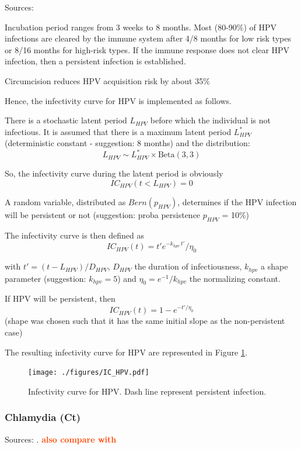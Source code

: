 \documentclass[11pt, onecolumn]{article}
\newcommand{\warning}[1]{\textbf{\textcolor{OrangeRed}{#1}}}
\begin{document}
Sources: \cite{Stanley:2011dd} \cite{Baussano:2013dh}


Incubation period ranges from 3 weeks to 8 months. Most (80-90\%) of HPV infections are cleared by the immune system after 4/8 months for low risk types or 8/16 months for high-risk types. If the immune response does not clear HPV infection, then a persistent infection is established.

Circumcision reduces HPV acquisition risk by about 35\% \cite{Tobian:2009kp}

Hence, the infectivity curve for HPV is implemented as follows. 

There is a stochastic latent period $L_{HPV}$ before which the individual is not infectious. It is assumed that there is a maximum latent period $L_{HPV}^*$ (deterministic constant - suggestion: 8 months) and the distribution:
$$L_{HPV} \sim L_{HPV}^* \times \mathrm{Beta}(3,3) $$

So, the infectivity curve during the latent period is obviously
$$IC_{HPV}(t< L_{HPV}) = 0$$

A random variable, distributed as $Bern(p_{HPV})$, determines if the HPV infection will be persistent or not (suggestion: proba persistence $p_{HPV}$ = 10\%)

The infectivity curve is then defined as
$$IC_{HPV}(t) = t' e^{-k_{hpv}\, t' }/ \eta_0$$

with $t' = (t-L_{HPV})/D_{HPV} $, $D_{HPV}$ the duration of infectiousness, $k_{hpv}$  a shape parameter (suggestion: $k_{hpv}=5$) and $\eta_0=e^{-1}/k_{hpv}$ the normalizing constant.

If HPV will be persistent, then 
$$IC_{HPV}(t) = 1- e^{-t'/\eta_0 }$$
(shape was chosen such that it has the same initial slope as the non-persistent case)

The resulting infectivity curve for HPV are represented in Figure \ref{fig:ICHPV}.
\begin{figure}[!ht]
\centering
    \texttt{[image: ./figures/IC\_HPV.pdf]}
\caption{Infectivity curve for HPV. Dash line represent persistent infection.}
\label{fig:ICHPV}
\end{figure}



\subsubsection{Chlamydia (Ct)}

Sources: \cite{Geisler:2010bc, Althaus:2011dc}. \warning{also compare with \cite{Hontelez:2013bc} \cite{Althaus:2012gg}}
\end{document}
